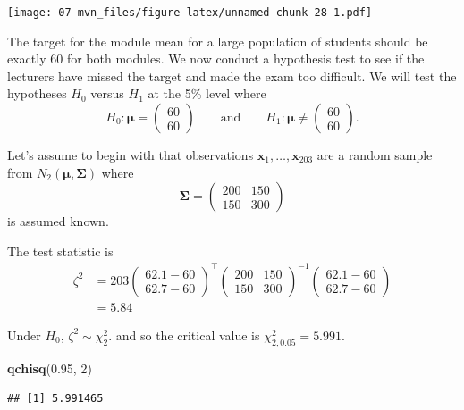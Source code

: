 \documentclass[]{book}
\newenvironment{Shaded}{\begin{snugshade}}{\end{snugshade}}
\newcommand{\DecValTok}[1]{\textcolor[rgb]{0.00,0.00,0.81}{#1}}
\newcommand{\FloatTok}[1]{\textcolor[rgb]{0.00,0.00,0.81}{#1}}
\newcommand{\KeywordTok}[1]{\textcolor[rgb]{0.13,0.29,0.53}{\textbf{#1}}}
\newcommand{\NormalTok}[1]{#1}
\theoremstyle{definition}
\theoremstyle{definition}
\theoremstyle{definition}
\theoremstyle{remark}
\begin{document}
\texttt{[image: 07-mvn\_files/figure-latex/unnamed-chunk-28-1.pdf]}

The target for the module mean for a large population of students should be exactly 60 for both modules. We now conduct a hypothesis test to see if the lecturers have missed the target and made the exam too difficult. We will test the hypotheses \(H_0\) versus \(H_1\) at the 5\% level where
\[
H_0: {\boldsymbol{\mu}}= \begin{pmatrix} 60 \\ 60 \end{pmatrix} \qquad \text{and} \qquad H_1: {\boldsymbol{\mu}}\neq \begin{pmatrix} 60 \\ 60 \end{pmatrix}.
\]

Let's assume to begin with that observations \(\mathbf x_1,\ldots,\mathbf x_{203}\) are a random sample from \(N_2({\boldsymbol{\mu}},\boldsymbol{\Sigma})\) where
\[
\boldsymbol{\Sigma}= \begin{pmatrix} 200 & 150 \\ 150 & 300 \end{pmatrix}
\]
is assumed known.

The test statistic is
\begin{align*}
\zeta^2 &= 203 \begin{pmatrix} 62.1 - 60 \\ 62.7 - 60 \end{pmatrix}^\top \begin{pmatrix} 200 & 150 \\ 150 & 300 \end{pmatrix}^{-1} \begin{pmatrix} 62.1 - 60 \\ 62.7 - 60 \end{pmatrix}\\
&=5.84
\end{align*}

Under \(H_0\), \(\zeta^2\sim \chi^2_2\). and so the critical value is \(\chi^2_{2,0.05} = 5.991\).

\begin{Shaded}
\begin{Highlighting}[]
\KeywordTok{qchisq}\NormalTok{(}\FloatTok{0.95}\NormalTok{, }\DecValTok{2}\NormalTok{)}
\end{Highlighting}
\end{Shaded}

\begin{verbatim}
## [1] 5.991465
\end{verbatim}
\end{document}
